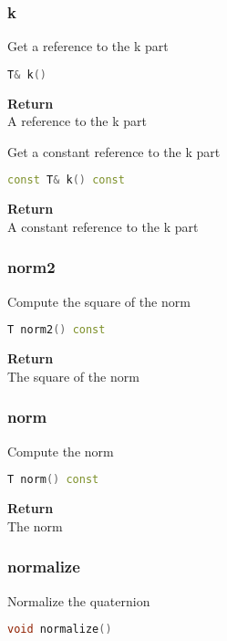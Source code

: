 \subsubsection{k}
\begin{mdframed}
Get a reference to the k part
\begin{lstlisting}[language=C++]
T& k()
\end{lstlisting}
\textbf{Return} \\ 
A reference to the k part\\ 
\end{mdframed}

\begin{mdframed}
Get a constant reference to the k part
\begin{lstlisting}[language=C++]
const T& k() const
\end{lstlisting}
\textbf{Return} \\ 
A constant reference to the k part\\ 
\end{mdframed}

\subsubsection{norm2}
\begin{mdframed}
Compute the square of the norm
\begin{lstlisting}[language=C++]
T norm2() const
\end{lstlisting}
\textbf{Return} \\ 
The square of the norm\\ 
\end{mdframed}

\subsubsection{norm}
\begin{mdframed}
Compute the norm
\begin{lstlisting}[language=C++]
T norm() const
\end{lstlisting}
\textbf{Return} \\ 
The norm\\ 
\end{mdframed}

\subsubsection{normalize}
\begin{mdframed}
Normalize the quaternion
\begin{lstlisting}[language=C++]
void normalize()
\end{lstlisting}
\end{mdframed}

